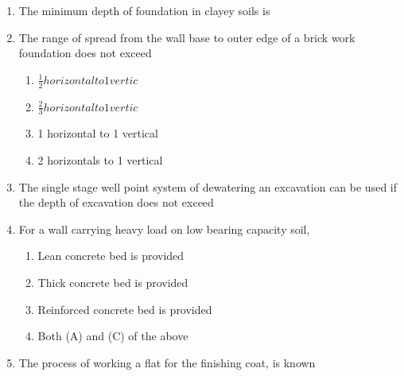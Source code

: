 \documentclass[11pt,a4paper]{article}
\begin{document}
\begin{enumerate}
\item{The minimum depth of foundation in clayey soils is}
\\
\item{The range of spread from the wall base to outer edge of a brick work foundation does not exceed}
\begin{enumerate}[label=\Alph*.]
\item{$ \frac{1}{2}$$ horizontal to 1 vertic $}
\item{$ \frac{2}{3}$$ horizontal to 1 vertic $}
\item{1 horizontal to 1 vertical}
\item{2 horizontals to 1 vertical}
\end{enumerate}
\item{The single stage well point system of dewatering an excavation can be used if the depth of excavation does not exceed}
\\
\item{For a wall carrying heavy load on low bearing capacity soil,}
\begin{enumerate}[label=\Alph*.]
\item{Lean concrete bed is provided}
\item{Thick concrete bed is provided}
\item{Reinforced concrete bed is provided}
\item{Both (A) and (C) of the above}
\end{enumerate}
\item{The process of working a flat for the finishing coat, is known}
\\
\end{enumerate}
\end{document}
